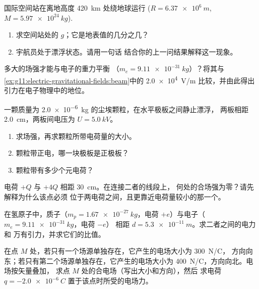 \begin{exercise}[$\star\star$]\label{exo:g11:electric-gravitational-fields:6}
国际空间站在离地高度 \qty{420}{km} 处绕地球运行
($R = \qty{6.37e6}{m}$, $M = \qty{5.97e24}{kg}$).
\begin{enumerate}
  \item 求空间站处的 $g$；它是地表值的几分之几？
  \item 宇航员处于漂浮状态。请用一句话
        结合你的上一问结果解释这一现象。
\end{enumerate}
\end{exercise}

\begin{exercise}[$\star\star$]\label{exo:g11:electric-gravitational-fields:7}
多大的场强才能与电子的重力平衡
（$m_e = \qty{9.11e-31}{kg}$）？将其与
\cref{ex:g11:electric-gravitational-fields:beam}中的 \qty{2.0e4}{V/m} 比较，并由此得出
引力在电子物理中的地位。
\end{exercise}

\begin{exercise}[$\star\star$]\label{exo:g11:electric-gravitational-fields:8}
一颗质量为 \qty{2.0e-6}{kg} 的尘埃颗粒，在水平极板之间静止漂浮，
两板相距 \qty{2.0}{cm}，两板间电压为 $U = \qty{5.0}{kV}$。
\begin{enumerate}
  \item 求场强，再求颗粒所带电荷量的大小。
  \item 颗粒带正电，哪一块极板是正极板？
  \item 颗粒带有多少个元电荷？
\end{enumerate}
\end{exercise}

\begin{exercise}[$\star\star$]\label{exo:g11:electric-gravitational-fields:9}
电荷 $+Q$ 与 $+4Q$ 相距 \qty{30}{cm}。在连接二者的线段上，
何处的合场强为零？请先解释为什么该点必须
位于两电荷之间，且更靠近电荷量较小的那一个。
\end{exercise}

\begin{exercise}[$\star\star$]\label{exo:g11:electric-gravitational-fields:10}
在氢原子中，质子（$m_p = \qty{1.67e-27}{kg}$，电荷
$+e$）与电子（$m_e = \qty{9.11e-31}{kg}$，电荷 $-e$）
相距 $d = \qty{5.3e-11}{m}$。求二者之间的电力和
万有引力，并求它们的比值。
\end{exercise}

\begin{exercise}[$\star\star$]\label{exo:g11:electric-gravitational-fields:11}
在点 $M$ 处，若只有一个场源单独存在，它产生的电场大小为 \qty{300}{N/C}，
方向向东；若只有第二个场源单独存在，它产生的电场大小为 \qty{400}{N/C}，方向向北。电场按矢量叠加，
求点 $M$ 处的合电场（写出大小和方向），然后
求电荷 $q = \qty{-2.0e-6}{C}$ 置于该点时所受的电场力。
\end{exercise}

